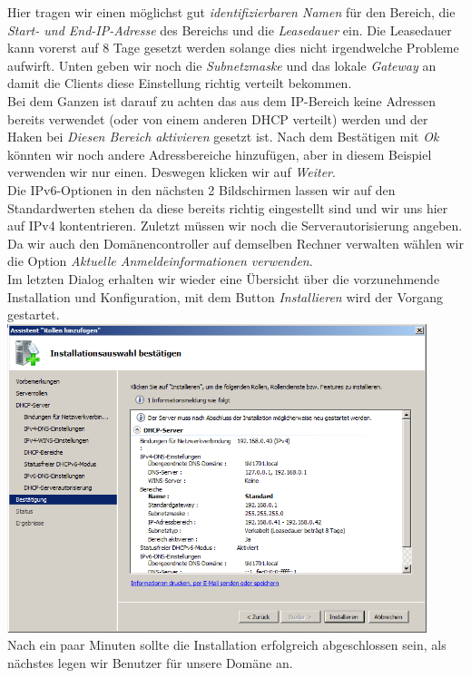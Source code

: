 \documentclass[12pt,a4paper,titlepage]{scrartcl} %
\begin{document}
Hier tragen wir einen möglichst gut \emph{identifizierbaren Namen} für den Bereich, die \emph{Start- und End-IP-Adresse} des Bereichs und die \emph{Leasedauer} ein. Die Leasedauer kann vorerst auf 8 Tage gesetzt werden solange dies nicht irgendwelche Probleme aufwirft. Unten geben wir noch die \emph{Subnetzmaske} und das lokale \emph{Gateway} an damit die Clients diese Einstellung richtig verteilt bekommen.\\	
Bei dem Ganzen ist darauf zu achten das aus dem IP-Bereich keine Adressen bereits verwendet (oder von einem anderen DHCP verteilt) werden und der Haken bei \emph{Diesen Bereich aktivieren} gesetzt ist. Nach dem Bestätigen mit \emph{Ok} könnten wir noch andere Adressbereiche hinzufügen, aber in diesem Beispiel verwenden wir nur einen. Deswegen klicken wir auf \emph{Weiter}.\\
Die IPv6-Optionen in den nächsten 2 Bildschirmen lassen wir auf den Standardwerten stehen da diese bereits richtig eingestellt sind und wir uns hier auf IPv4 kontentrieren. Zuletzt müssen wir noch die Serverautorisierung angeben. Da wir auch den Domänencontroller auf demselben Rechner verwalten wählen wir die Option \emph{Aktuelle Anmeldeinformationen verwenden}.\\
Im letzten Dialog erhalten wir wieder eine Übersicht über die vorzunehmende Installation und Konfiguration, mit dem Button \emph{Installieren} wird der Vorgang gestartet.\\ 

	\includegraphics[height=9cm]{Bilder/048(DHCP10)}\\
	
Nach ein paar Minuten sollte die Installation erfolgreich abgeschlossen sein, als nächstes legen wir Benutzer für unsere Domäne an.
\end{document}
